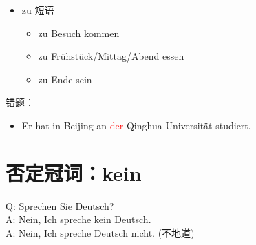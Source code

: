 \begin{itemize}
\begin{itemize}
                    \begin{itemize}
                        \item xxx heißen.
                        \item Spaß machen. (有乐趣)
                        \item Urlaub machen.
                        \item Unterricht haben.
                        \item Auto fahren.
                        \item in Ordnung sein.
                        \item Pause machen.
                        \item Um Uhrzeit. (Um Mitternacht)
                        \item Geburstag haben.
                        \item Probe haben.
                    \end{itemize}
              \item zu 短语
                    \begin{itemize}
                        \item zu Besuch kommen
                        \item zu Frühstück/Mittag/Abend essen
                        \item zu Ende sein
                    \end{itemize}
          \end{itemize}
\end{itemize}

错题：\\
\begin{itemize}
    \item Er hat in Beijing an \textcolor{red}{der} Qinghua-Universität studiert.
\end{itemize}

\setlength{\parindent}{0pt}
\section{否定冠词：kein}
Q: Sprechen Sie Deutsch?  \\
A: Nein, Ich spreche kein Deutsch.  \\
A: Nein, Ich spreche Deutsch nicht. (不地道) \\

